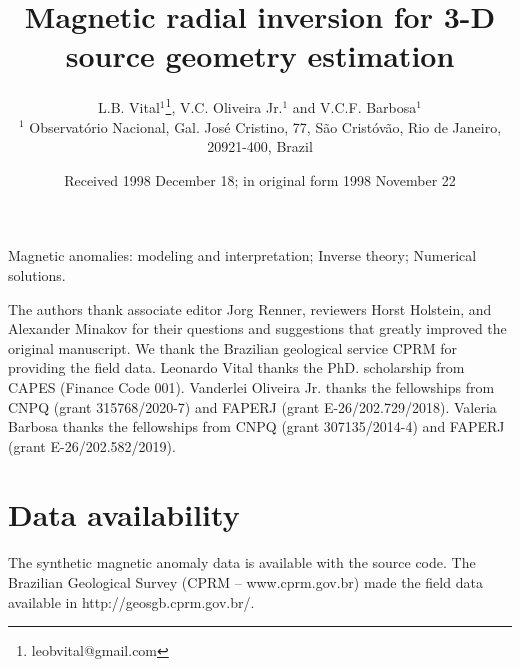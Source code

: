 \documentclass[extra,mreferee]{gji}
\title[Geophys.\ J.\ Int.: Magnetic radial inversion]
  {Magnetic radial inversion for 3-D source geometry estimation}
\author[L.B. Vital, V.C. Oliveira Jr. and V.C.F. Barbosa]
  {L.B. Vital$^1$\thanks{leobvital@gmail.com}, 
  V.C. Oliveira Jr.$^1$ and V.C.F. Barbosa$^1$\\
  $^1$ Observat{\'o}rio Nacional, Gal. Jos{\'e} Cristino, 77, São Crist{\'o}v{\~a}o,
  Rio de Janeiro, 20921-400, Brazil
  }
\date{Received 1998 December 18; in original form 1998 November 22}
\begin{document}
\label{firstpage}

\maketitle



\begin{keywords}
 Magnetic anomalies: modeling and interpretation; Inverse theory; Numerical solutions.
\end{keywords}











\begin{acknowledgments}
The authors thank associate editor Jorg Renner, reviewers Horst Holstein, and Alexander Minakov 
for their questions and suggestions that greatly improved the original manuscript.	
We thank the Brazilian geological service CPRM for providing the field data. 
Leonardo Vital thanks the PhD. scholarship from CAPES (Finance Code 001). 
Vanderlei Oliveira Jr. thanks the fellowships from CNPQ (grant 315768/2020-7) and 
FAPERJ (grant E-26/202.729/2018).  
Valeria Barbosa thanks the fellowships from CNPQ (grant 307135/2014-4) and 
FAPERJ (grant E-26/202.582/2019).
\end{acknowledgments}

\section*{Data availability}

The synthetic magnetic anomaly data is available with the source code. The Brazilian Geological Survey (CPRM – www.cprm.gov.br) made the field data available in http://geosgb.cprm.gov.br/.






\appendix

\label{lastpage}
\end{document}
